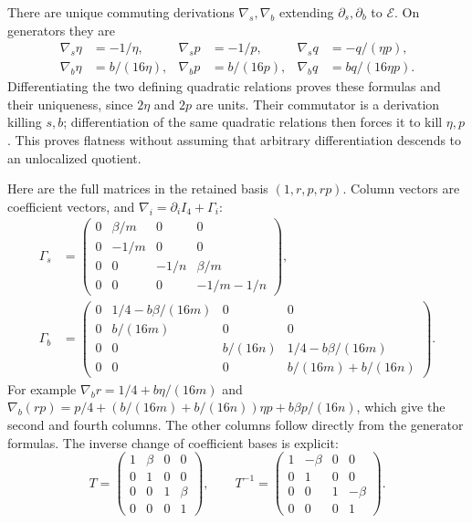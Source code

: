 There are unique commuting derivations $\nabla_s,\nabla_b$ extending
$\partial_s,\partial_b$ to $\mathcal E$. On generators they are
\begin{align*}
 \nabla_s\eta&=-1/\eta,&\nabla_sp&=-1/p,&
 \nabla_sq&=-q/(\eta p),\\
 \nabla_b\eta&=b/(16\eta),&\nabla_bp&=b/(16p),&
 \nabla_bq&=bq/(16\eta p).
\end{align*}
Differentiating the two defining quadratic relations proves these
formulas and their uniqueness, since $2\eta$ and $2p$ are units.
Their commutator is a derivation killing $s,b$; differentiation of
the same quadratic relations then forces it to kill $\eta,p$.
This proves flatness without assuming that arbitrary differentiation
descends to an unlocalized quotient.

Here are the full matrices in the retained basis $(1,r,p,rp)$.
Column vectors are coefficient vectors, and
$\nabla_i=\partial_iI_4+\Gamma_i$:
\begin{align*}
 \Gamma_s&=\begin{pmatrix}
 0&\beta/m&0&0\\0&-1/m&0&0\\
 0&0&-1/n&\beta/m\\0&0&0&-1/m-1/n
 \end{pmatrix},\\
 \Gamma_b&=\begin{pmatrix}
 0&1/4-b\beta/(16m)&0&0\\0&b/(16m)&0&0\\
 0&0&b/(16n)&1/4-b\beta/(16m)\\
 0&0&0&b/(16m)+b/(16n)
 \end{pmatrix}.
\end{align*}
For example $\nabla_br=1/4+b\eta/(16m)$ and
$\nabla_b(rp)=p/4+(b/(16m)+b/(16n))\eta p
+b\beta p/(16n)$, which give the second and fourth columns.
The other columns follow directly from the generator formulas.
The inverse change of coefficient bases is explicit:
\[
 T=\begin{pmatrix}1&\beta&0&0\\0&1&0&0\\
 0&0&1&\beta\\0&0&0&1\end{pmatrix},\qquad
 T^{-1}=\begin{pmatrix}1&-\beta&0&0\\0&1&0&0\\
 0&0&1&-\beta\\0&0&0&1\end{pmatrix}.
\]
